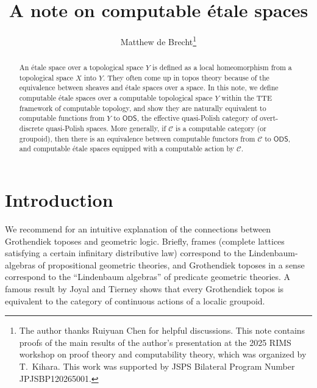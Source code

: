 \documentclass[envcountsame]{llncs}
\def\calC{{\mathcal{C}}}
\newcommand{\cntSets}{{\mathsf{ODS}}}
\begin{document}
\title{A note on computable \'{e}tale spaces}
\author{Matthew de Brecht\thanks{The author thanks Ruiyuan Chen for helpful discussions. This note contains proofs of the main results of the author's presentation at the 2025 RIMS workshop on proof theory and computability theory, which was organized by T.~Kihara. This work was supported by JSPS Bilateral Program Number JPJSBP120265001.}}

\maketitle

\begin{abstract}
An \'{e}tale space over a topological space $Y$ is defined as a local homeomorphism from a topological space $X$ into $Y$. They often come up in topos theory because of the equivalence between sheaves and \'{e}tale spaces over a space. In this note, we define computable \'{e}tale spaces over a computable topological space $Y$ within the TTE framework of computable topology, and show they are naturally equivalent to computable functions from $Y$ to $\cntSets$, the effective quasi-Polish category of overt-discrete quasi-Polish spaces. More generally, if $\calC$ is a computable category (or groupoid), then there is an equivalence between computable functors from $\calC$ to $\cntSets$, and computable \'{e}tale spaces equipped with a computable action by $\calC$. 
\end{abstract}



\section{Introduction}

We recommend \cite{V07} for an intuitive explanation of the connections between Grothendiek toposes and geometric logic. Briefly, frames (complete lattices satisfying a certain infinitary distributive law) correspond to the Lindenbaum-algebras of propositional geometric theories, and Grothendiek toposes in a sense correspond to the ``Lindenbaum algebras'' of predicate geometric theories. A famous result by Joyal and Tierney \cite{JT84} shows that every Grothendiek topos is equivalent to the category of continuous actions of a localic groupoid.
\end{document}

